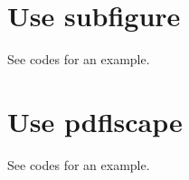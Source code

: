 \documentclass[]{article}
\begin{document}
\section{Use subfigure}
See codes for an example. 


\section{Use pdflscape}
See codes for an example. 





\end{document}
